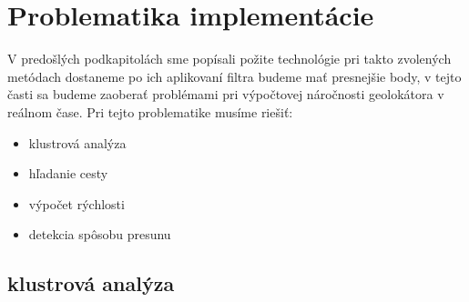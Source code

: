 \section{Problematika implementácie}

V predošlých podkapitolách sme popísali požite technológie pri takto zvolených metódach
dostaneme po ich aplikovaní filtra budeme mať presnejšie body, v tejto časti sa budeme
zaoberať problémami pri výpočtovej náročnosti geolokátora v reálnom čase. Pri tejto
problematike musíme riešiť:

\begin{itemize}
\item klustrová analýza
\item hľadanie cesty
\item výpočet rýchlosti 
\item detekcia spôsobu presunu
\end{itemize}

\subsection{klustrová analýza}

